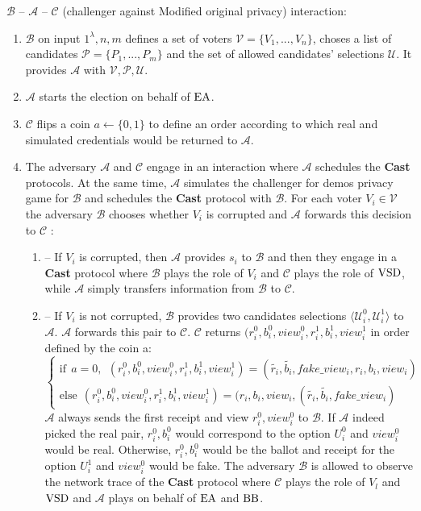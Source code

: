 $\mathcal{B}$ -- $\mathcal{A}$ -- $\mathcal{C}$ (challenger against Modified original privacy) interaction: 
\begin{enumerate}
\item $\mathcal{B}$ on input $1^{\lambda},n,m$ defines a set of voters  $\mathcal{V} = \{V_1,...,V_n\}$, choses a list of candidates  $\mathcal{P} = \{P_1,...,P_m\}$ and the set of allowed candidates' selections $\mathcal{U}$.  It provides $\mathcal{A}$ with $\mathcal{V}, \mathcal{P}, \mathcal{U}$.
 \item $\mathcal{A}$ starts the election on behalf of $\operatorname{EA}$.
 \item $\mathcal{C}$ flips a coin $a \leftarrow \{0,1\}$ to define an order according to which real and simulated credentials would be returned to $\mathcal{A}$. 
 \item The adversary $\mathcal{A}$  and $\mathcal{C}$ engage in an interaction where $\mathcal{A}$ schedules the \textbf{Cast} protocols. At the same time, $\mathcal{A}$ simulates the challenger for demos privacy game for $\mathcal{B}$ and schedules the  \textbf{Cast}  protocol with $\mathcal{B}$. For each voter  $V_i \in \mathcal{V}$ the adversary $\mathcal{B}$  chooses whether $V_i$ is corrupted and $\mathcal{A}$ forwards this decision to $\mathcal{C}$ :
 \begin{enumerate}
\item[] -- If $V_i$ is corrupted, then $\mathcal{A}$ provides $s_i$ to $\mathcal{B}$ and then they engage in a \textbf{Cast} protocol where  $\mathcal{B}$ plays the role of $V_i$ and  $\mathcal{C}$ plays the role of $\operatorname{VSD}$, while $\mathcal{A}$ simply transfers information from $\mathcal{B}$ to $\mathcal{C}$.
\item[] --  If $V_i$ is not corrupted, $\mathcal{B}$ provides two candidates selections $\langle \mathcal{U}^0_i , \mathcal{U}^1_i \rangle$ to $\mathcal{A}$. $\mathcal{A}$ forwards this pair to $\mathcal{C}$.  $\mathcal{C}$ returns $(r_i^0,b_i^0,view_i^0,r_i^1,b_i^1,view_i^1$ in order defined by the coin a:\\
$ \begin{cases}
 \text{if} ~~a =0,~~ (r_i^0,b_i^0,view_i^0,r_i^1,b_i^1,view_i^1) = (\tilde{r_i},\tilde{b_i},fake\_view_i,r_i,b_i,view_i)  \\ 
 \text{else}~~  (r_i^0,b_i^0,view_i^0,r_i^1,b_i^1,view_i^1) = (r_i,b_i,view_i,(\tilde{r_i},\tilde{b_i},fake\_view_i)
\end{cases}$\\
$\mathcal{A}$ always sends the first receipt and view $r^0_i,view_i^0$ to  $\mathcal{B}$.  If  $\mathcal{A}$ indeed picked the real pair, $r_i^0,b_i^0$ would correspond to the option  $U^0_i$  and $view_i^0$ would be real. Otherwise, $r_i^0,b_i^0$ would be the ballot and receipt for the option  $U^1_i$ and $view_i^0$ would be fake. The adversary  $\mathcal{B}$ is allowed to observe the network trace of the \textbf{Cast} protocol where $\mathcal{C}$ plays the role of $V_l$ and $\operatorname{VSD}$ and  $\mathcal{A}$ plays on behalf of $\operatorname{EA}$ and $\operatorname{BB}$. 

\end{enumerate}
\end{enumerate}
